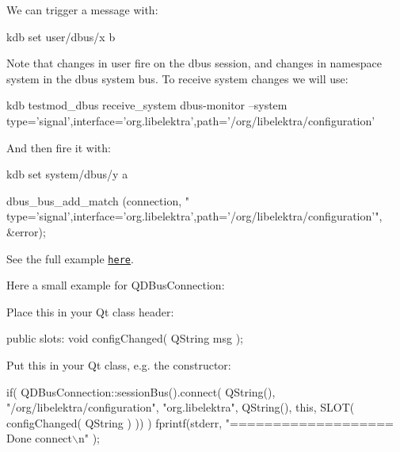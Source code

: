 We can trigger a message with\+:


\begin{DoxyCode}
kdb set user/dbus/x b
\end{DoxyCode}


Note that changes in {\ttfamily user} fire on the dbus {\ttfamily session}, and changes in namespace {\ttfamily system} in the dbus {\ttfamily system} bus. To receive {\ttfamily system} changes we will use\+:


\begin{DoxyCode}
kdb testmod\_dbus receive\_system
dbus-monitor --system type='signal',interface='org.libelektra',path='/org/libelektra/configuration'
\end{DoxyCode}


And then fire it with\+:


\begin{DoxyCode}
kdb set system/dbus/y a
\end{DoxyCode}



\begin{DoxyCode}
dbus\_bus\_add\_match (connection, \textcolor{stringliteral}{"
      type='signal',interface='org.libelektra',path='/org/libelektra/configuration'"}, &error);
\end{DoxyCode}


See the full example \href{/home/jenkins/workspace/libelektra-release/src/plugins/dbus/receivemessage.c}{\tt here}.

Here a small example for Q\+D\+Bus\+Connection\+:

Place this in your Qt class header\+:


\begin{DoxyCode}
\textcolor{keyword}{public} slots:
  \textcolor{keywordtype}{void} configChanged( QString msg );
\end{DoxyCode}


Put this in your Qt class, e.\+g. the constructor\+:


\begin{DoxyCode}
\textcolor{keywordflow}{if}( QDBusConnection::sessionBus().connect( QString(), \textcolor{stringliteral}{"/org/libelektra/configuration"}, \textcolor{stringliteral}{"org.libelektra"}, 
      QString(),
                                       \textcolor{keyword}{this}, SLOT( configChanged( QString ) )) )
    fprintf(stderr, \textcolor{stringliteral}{"=================== Done connect\(\backslash\)n"} );
\end{DoxyCode}


